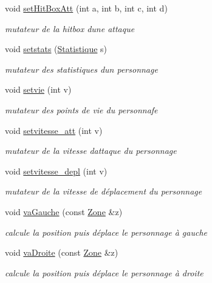 \begin{DoxyCompactItemize}
void \hyperlink{class_personnage_aba09ef09539b2b44de79cd5c0eb3139d}{set\+Hit\+Box\+Att} (int a, int b, int c, int d)
\begin{DoxyCompactList}\small\item\em mutateur de la hitbox d\textquotesingle{}une attaque \end{DoxyCompactList}\item 
void \hyperlink{class_personnage_adb15b654ddd26ba1c6944d62b607a163}{setstats} (\hyperlink{class_statistique}{Statistique} s)
\begin{DoxyCompactList}\small\item\em mutateur des statistiques d\textquotesingle{}un personnage \end{DoxyCompactList}\item 
void \hyperlink{class_personnage_abf011d14740f841ac11580ed4af305d0}{setvie} (int v)
\begin{DoxyCompactList}\small\item\em mutateur des points de vie du personnafe \end{DoxyCompactList}\item 
void \hyperlink{class_personnage_acc01f2696e2fd76f72e62aec460b9c58}{setvitesse\+\_\+att} (int v)
\begin{DoxyCompactList}\small\item\em mutateur de la vitesse d\textquotesingle{}attaque du personnage \end{DoxyCompactList}\item 
void \hyperlink{class_personnage_a83413930bb8bf7989828038c659e315f}{setvitesse\+\_\+depl} (int v)
\begin{DoxyCompactList}\small\item\em mutateur de la vitesse de déplacement du personnage \end{DoxyCompactList}\item 
void \hyperlink{class_personnage_a35571e5e906d9e04f901ac73c6bd9869}{va\+Gauche} (const \hyperlink{class_zone}{Zone} \&z)
\begin{DoxyCompactList}\small\item\em calcule la position puis déplace le personnage à gauche \end{DoxyCompactList}\item 
void \hyperlink{class_personnage_a3f17f84143f3a6f8fcafa1a9ecd5ced6}{va\+Droite} (const \hyperlink{class_zone}{Zone} \&z)
\begin{DoxyCompactList}\small\item\em calcule la position puis déplace le personnage à droite \end{DoxyCompactList}\item 

\end{DoxyCompactItemize}
